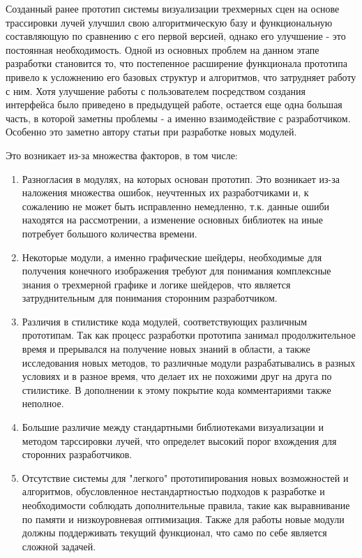 Созданный ранее прототип системы визуализации трехмерных сцен на основе трассировки лучей улучшил свою алгоритмическую базу и функциональную составляющую по сравнению с его первой версией, однако его улучшение - это постоянная необходимость. Одной из основных проблем на данном этапе разработки становится то, что постепенное расширение функционала прототипа привело к усложнению его базовых структур и алгоритмов, что затрудняет работу с ним. Хотя улучшение работы с пользователем посредством создания интерфейса было приведено в предыдущей работе, остается еще одна большая часть, в которой заметны проблемы - а именно взаимодействие с разработчиком. Особенно это заметно автору статьи при разработке новых модулей. 

Это возникает из-за множества факторов, в том числе:


\begin{enumerate} 
	\item Разногласия в модулях, на которых основан прототип. Это возникает из-за  наложения множества ошибок, неучтенных их разработчиками и, к сожалению не может быть исправленно немедленно, т.к. данные ошиби находятся на рассмотрении, а изменение основных библиотек на иные потребует большого количества времени.
	\item Некоторые модули, а именно графические шейдеры, необходимые для получения конечного  изображения требуют для понимания комплексные знания о трехмерной графике и логике шейдеров, что является затруднительным для понимания сторонним разработчиком.
	\item Различия в стилистике кода модулей, соответствующих различным прототипам. Так как процесс разработки прототипа занимал продолжительное время и прерывался на получение новых знаний в области, а также исследования новых методов, то различные модули разрабатывались в разных условиях и в разное время, что делает их не похожими друг на друга по стилистике. В дополнении к этому покрытие кода комментариями также неполное.
	\item Большие различие между стандартными библиотеками визуализации и методом тарссировки лучей, что определет высокий порог вхождения для сторонних разработчиков.
	\item Отсутствие системы для "легкого" прототипирования новых возможностей и алгоритмов, обусловленное нестандартностью подходов к разработке и необходимости соблюдать дополнительные правила, такие как выравнивание по памяти и низкоуровневая оптимизация. Также для работы новые модули должны поддерживать текущий функционал, что само по себе является сложной задачей.
\end{enumerate}


